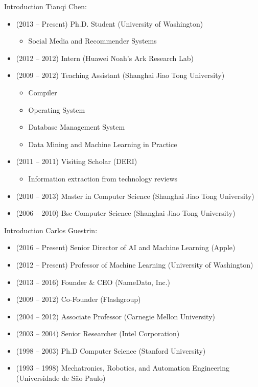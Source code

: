 \documentclass{beamer}
\begin{document}
\begin{frame}{Introduction}
	Tianqi Chen:
	
	\begin{itemize}
		\item (2013 – Present) Ph.D. Student (University of Washington)
			\begin{itemize}
			\item Social Media and Recommender Systems
			\end{itemize}
		\item (2012 – 2012) Intern (Huawei Noah's Ark Research Lab)
		\item (2009 – 2012) Teaching Assistant (Shanghai Jiao Tong University)
		\begin{itemize}
			\item Compiler
			\item Operating System
			\item Database Management System
			\item Data Mining and Machine Learning in Practice
		\end{itemize}
		\item (2011 – 2011) Visiting Scholar (DERI)
		\begin{itemize}
			\item Information extraction from technology reviews
		\end{itemize}
		\item (2010 – 2013) Master in Computer Science (Shanghai Jiao Tong University)
		\item (2006 – 2010) Bsc Computer Science (Shanghai Jiao Tong University)
	\end{itemize}
	
\end{frame}

\begin{frame}{Introduction}
	Carlos Guestrin:
	
	\begin{itemize}
	\item (2016 – Present) Senior Director of AI and Machine Learning (Apple)
	\item (2012 – Present) Professor of Machine Learning (University of Washington)
	\item (2013 – 2016) Founder $\&$ CEO (NameDato, Inc.)
	\item (2009 – 2012) Co-Founder (Flashgroup)
	\item (2004 – 2012) Associate Professor (Carnegie Mellon University)
	\item (2003 – 2004) Senior Researcher (Intel Corporation)
	\item (1998 – 2003) Ph.D Computer Science (Stanford University)
	\item (1993 – 1998) Mechatronics, Robotics, and Automation Engineering (Universidade de São Paulo)
	\end{itemize}
	
\end{frame}
\end{document}
